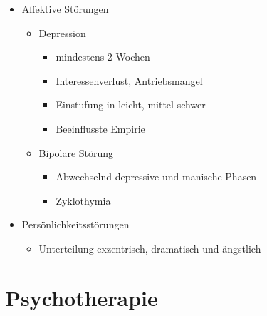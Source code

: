 \documentclass[11pt, paper=a4, twocolumn]{scrartcl}
\begin{document}
\begin{itemize}
		\item Affektive Störungen
			\begin{itemize}
				\item Depression
					\begin{itemize}
						\item mindestens 2 Wochen
						\item Interessenverlust, Antriebsmangel
						\item Einstufung in leicht, mittel schwer
						\item Beeinflusste Empirie
					\end{itemize}
				\item Bipolare Störung
					\begin{itemize}
						\item Abwechselnd depressive und manische 
							Phasen
						\item Zyklothymia
					\end{itemize}
			\end{itemize}

		\item Persönlichkeitsstörungen
			\begin{itemize}
				\item Unterteilung exzentrisch, dramatisch und ängstlich 
			\end{itemize}


	\end{itemize}
	\section{Psychotherapie}
\end{document}
